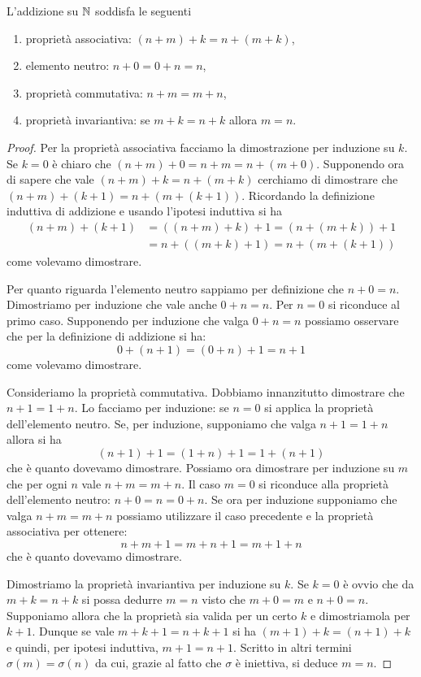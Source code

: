 \begin{theorem}
  L'addizione su ${\mathbb N}$ soddisfa le seguenti
  \begin{enumerate}
    \item proprietà associativa: $(n+m)+k = n + (m + k)$,
    \item elemento neutro: $n+0 = 0+n = n$,
    \item proprietà commutativa: $n+m = m+n$,
    \item proprietà invariantiva: se $m+k = n+k$ allora $m=n$.
  \end{enumerate}
\end{theorem}
\begin{proof}
Per la proprietà associativa facciamo la dimostrazione 
per induzione su $k$. 
Se $k=0$ è chiaro che $(n+m)+0 = n+m = n+(m+0)$.
Supponendo ora di sapere che vale $(n+m)+k = n+(m+k)$
cerchiamo di dimostrare che $(n+m)+(k+1) = n+(m+(k+1))$.
Ricordando la definizione induttiva di addizione e usando 
l'ipotesi induttiva si ha 
\begin{align*}
(n+m)+(k+1) 
 &= ((n+m)+k)+1 
 = (n+(m+k))+ 1\\
 &= n + ((m+k)+1)
 = n + (m+(k+1))
\end{align*}
come volevamo dimostrare.

Per quanto riguarda l'elemento neutro sappiamo per definizione 
che $n+0=n$. Dimostriamo per induzione che vale anche $0+n=n$.
Per $n=0$ si riconduce al primo caso.
Supponendo per induzione che valga $0+n=n$ possiamo osservare 
che per la definizione di addizione si ha:
\[
0 + (n+1) =  (0+n)+1 = n + 1
\]
come volevamo dimostrare.

Consideriamo la proprietà commutativa.
Dobbiamo innanzitutto dimostrare che $n+1 = 1+n$.
Lo facciamo per induzione: se $n=0$ si applica la proprietà 
dell'elemento neutro.
Se, per induzione, supponiamo che valga $n+1=1+n$ allora 
si ha
\[
 (n+1) + 1 = (1+n) + 1 = 1+(n+1)
\]
che è quanto dovevamo dimostrare.
Possiamo ora dimostrare per 
induzione su $m$ che per ogni $n$ vale $n+m = m+n$.
Il caso $m=0$ si riconduce alla proprietà dell'elemento 
neutro: $n+0 = n = 0 + n$.
Se ora per induzione supponiamo che valga $n+m=m+n$ possiamo 
utilizzare il caso precedente e la proprietà associativa per ottenere:
\[
  n + m + 1 = m + n + 1 = m + 1 + n   
\]
che è quanto dovevamo dimostrare.

Dimostriamo la proprietà invariantiva per induzione su $k$.
Se $k=0$ è ovvio che da $m+k=n+k$ si possa dedurre $m=n$
visto che $m+0=m$ e $n+0=n$.
Supponiamo allora che la proprietà sia valida per un certo $k$
e dimostriamola per $k+1$.
Dunque se vale $m+k+1=n+k+1$ si ha $(m+1)+k=(n+1)+k$
e quindi, per ipotesi induttiva, $m+1 = n+1$.
Scritto in altri termini $\sigma(m)=\sigma(n)$ da cui,
grazie al fatto che $\sigma$ è iniettiva, si deduce $m=n$.
\end{proof}

